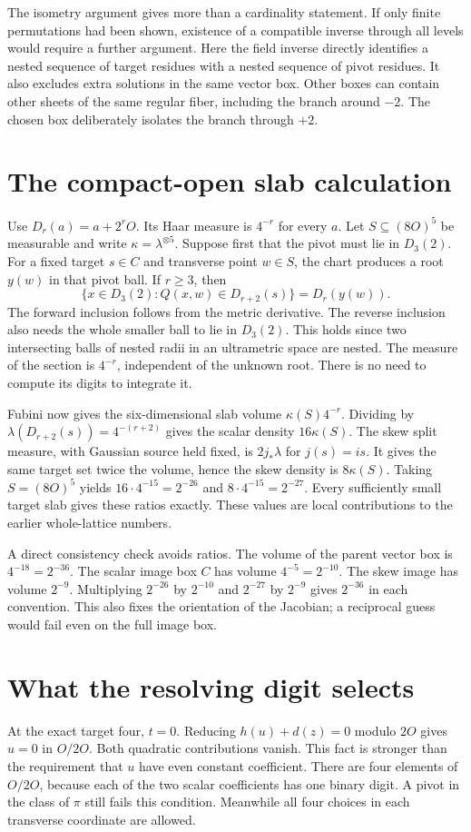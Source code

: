 \documentclass[12pt,letterpaper]{article}
\begin{document}
The isometry argument gives more than a cardinality statement. If only finite permutations had been shown, existence of a compatible inverse through all levels would require a further argument. Here the field inverse directly identifies a nested sequence of target residues with a nested sequence of pivot residues. It also excludes extra solutions in the same vector box. Other boxes can contain other sheets of the same regular fiber, including the branch around $-2$. The chosen box deliberately isolates the branch through $+2$.

\section{The compact-open slab calculation}
Use $D_r(a)=a+2^rO$. Its Haar measure is $4^{-r}$ for every $a$. Let $S\subseteq(8O)^5$ be measurable and write $\kappa=\lambda^{\otimes5}$. Suppose first that the pivot must lie in $D_3(2)$. For a fixed target $s\in C$ and transverse point $w\in S$, the chart produces a root $y(w)$ in that pivot ball. If $r\ge3$, then
\[
 \{x\in D_3(2): Q(x,w)\in D_{r+2}(s)\}=D_r(y(w)).
\]
The forward inclusion follows from the metric derivative. The reverse inclusion also needs the whole smaller ball to lie in $D_3(2)$. This holds since two intersecting balls of nested radii in an ultrametric space are nested. The measure of the section is $4^{-r}$, independent of the unknown root. There is no need to compute its digits to integrate it.

Fubini now gives the six-dimensional slab volume $\kappa(S)4^{-r}$. Dividing by $\lambda(D_{r+2}(s))=4^{-(r+2)}$ gives the scalar density $16\kappa(S)$. The skew split measure, with Gaussian source held fixed, is $2j_*\lambda$ for $j(s)=is$. It gives the same target set twice the volume, hence the skew density is $8\kappa(S)$. Taking $S=(8O)^5$ yields $16\cdot 4^{-15}=2^{-26}$ and $8\cdot 4^{-15}=2^{-27}$. Every sufficiently small target slab gives these ratios exactly. These values are local contributions to the earlier whole-lattice numbers.

A direct consistency check avoids ratios. The volume of the parent vector box is $4^{-18}=2^{-36}$. The scalar image box $C$ has volume $4^{-5}=2^{-10}$. The skew image has volume $2^{-9}$. Multiplying $2^{-26}$ by $2^{-10}$ and $2^{-27}$ by $2^{-9}$ gives $2^{-36}$ in each convention. This also fixes the orientation of the Jacobian; a reciprocal guess would fail even on the full image box.

\section{What the resolving digit selects}
At the exact target four, $t=0$. Reducing $h(u)+d(z)=0$ modulo $2O$ gives $u=0$ in $O/2O$. Both quadratic contributions vanish. This fact is stronger than the requirement that $u$ have even constant coefficient. There are four elements of $O/2O$, because each of the two scalar coefficients has one binary digit. A pivot in the class of $\pi$ still fails this condition. Meanwhile all four choices in each transverse coordinate are allowed.
\end{document}
